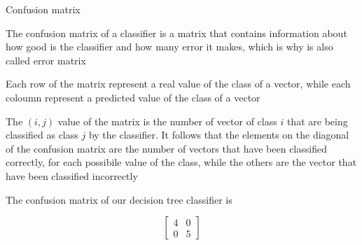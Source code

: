 \begin{frame}{Confusion matrix}
	
	The confusion matrix of a classifier is a matrix that contains information about how good is the classifier and how many error it makes, which is why is also called error matrix
	
	Each row of the matrix represent a real value of the class of a vector, while each coloumn represent a predicted value of the class of a vector
	
	The $(i,j)$ value of the matrix is the number of vector of class $i$ that are being classified as class $j$ by the classifier. It follows that the elements on the diagonal of the confusion matrix are the number of vectors that have been classified correctly, for each possibile value of the class, while the others are the vector that have been classified incorrectly
	
	The confusion matrix of our decision tree classifier is 
	
	\[ 
		\begin{bmatrix}
		4 & 0 \\
		0 & 5 
		\end{bmatrix}
	\]
	

	
	
	
\end{frame}

